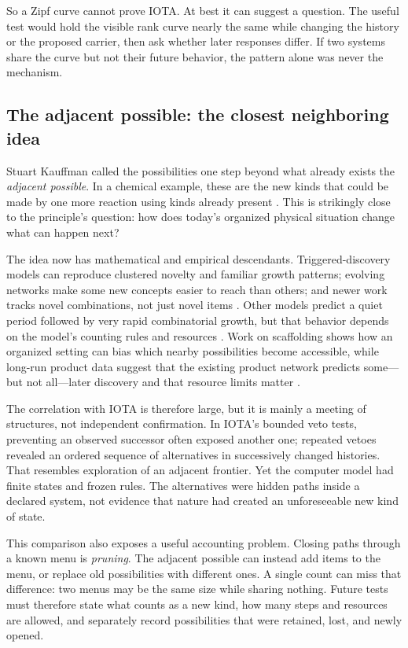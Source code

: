 \documentclass[11pt]{article}
\begin{document}
So a Zipf curve cannot prove IOTA. At best it can suggest a question. The useful
test would hold the visible rank curve nearly the same while changing the
history or the proposed carrier, then ask whether later responses differ. If
two systems share the curve but not their future behavior, the pattern alone
was never the mechanism.

\subsection*{The adjacent possible: the closest neighboring idea}

Stuart Kauffman called the possibilities one step beyond what already exists
the \emph{adjacent possible}. In a chemical example, these are the new kinds
that could be made by one more reaction using kinds already present
\citep{Kauffman2000Investigations}. This is strikingly close to the principle's
question: how does today's organized physical situation change what can happen
next?

The idea now has mathematical and empirical descendants. Triggered-discovery
models can reproduce clustered novelty and familiar growth patterns; evolving
networks make some new concepts easier to reach than others; and newer work
tracks novel combinations, not just novel items
\citep{TriaEtAl2014Novelties,IacopiniEtAl2018Innovation,DiBonaEtAl2025HigherOrder}.
Other models predict a quiet period followed by very rapid combinatorial
growth, but that behavior depends on the model's counting rules and resources
\citep{CortesEtAl2025TAP}. Work on scaffolding shows how an organized setting
can bias which nearby possibilities become accessible, while long-run product
data suggest that the existing product network predicts some---but not
all---later discovery and that resource limits matter
\citep{Griesemer2024Scaffolded,Taalbi2026AdjacentPossible}.

The correlation with IOTA is therefore large, but it is mainly a meeting of
structures, not independent confirmation. In IOTA's bounded veto tests,
preventing an observed successor often exposed another one; repeated vetoes
revealed an ordered sequence of alternatives in successively changed histories.
That resembles exploration of an adjacent frontier. Yet the computer model had
finite states and frozen rules.
The alternatives were hidden paths inside a declared system, not evidence that
nature had created an unforeseeable new kind of state.

This comparison also exposes a useful accounting problem. Closing paths through
a known menu is \emph{pruning}. The adjacent possible can instead add items to
the menu, or replace old possibilities with different ones. A single count can
miss that difference: two menus may be the same size while sharing nothing.
Future tests must therefore state what counts as a new kind, how many steps and
resources are allowed, and separately record possibilities that were retained,
lost, and newly opened.
\end{document}
